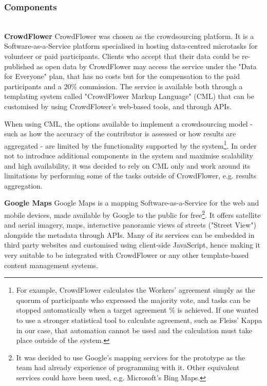 \subsubsection{Components} \leavevmode \\ %

\textbf{CrowdFlower} CrowdFlower was chosen as the crowdsourcing platform. It is a Software-as-a-Service platform specialised in hosting data-centred microtasks for volunteer or paid participants. Clients who accept that their data could be re-published as open data by CrowdFlower may access the service under the "Data for Everyone" plan, that has no costs but for the compensation to the paid participants and a 20\% commission. The service is available both through a templating system called "CrowdFlower Markup Language" (CML) that can be customised by using CrowdFlower's web-based tools, and through APIs. 

When using CML, the options available to implement a crowdsourcing model - such as how the accuracy of the contributor is assessed or how results are aggregated - are limited by the functionality supported by the system\footnote{For example, CrowdFlower calculates the Workers' agreement simply as the quorum of participants who expressed the majority vote, and tasks can be stopped automatically when a target agreement \% is achieved. If one wanted to use a stronger statistical tool to calculate agreement, such as Fleiss' Kappa in our case, that automation cannot be used and the calculation must take place outside of the system.}. In order not to introduce additional components in the system and maximise scalability and high availability, it was decided to rely on CML only and work around its limitations by performing some of the tasks outside of CrowdFlower, e.g. results aggregation. 

\textbf{Google Maps} Google Maps is a mapping Software-as-a-Service for the web and mobile devices, made available by Google to the public for free\footnote{It was decided to use Google's mapping services for the prototype as the team had already experience of programming with it. Other equivalent services could have been used, e.g. Microsoft's Bing Maps.}. It offers satellite and aerial imagery, maps, interactive panoramic views of streets ("Street View") alongside the metadata through APIs. Many of its services can be embedded in third party websites and customised using client-side JavaScript, hence making it very suitable to be integrated with CrowdFlower or any other template-based content management systems. 

